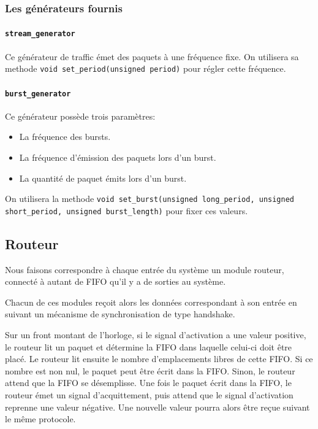 \subsubsection{Les générateurs fournis}

\paragraph{\texttt{stream\_generator} \\}

Ce générateur de traffic émet des paquets à une fréquence fixe. On utilisera sa
methode \texttt{void set\_period(unsigned period)} pour régler cette fréquence.

\paragraph{\texttt{burst\_generator} \\}

Ce générateur possède trois paramètres:
\begin{itemize}
  \item La fréquence des bursts.
  \item La fréquence d'émission des paquets lors d'un burst.
  \item La quantité de paquet émits lors d'un burst.
\end{itemize}
On utilisera la methode \texttt{void set\_burst(unsigned long\_period, unsigned
short\_period, unsigned burst\_length)} pour fixer ces valeurs.

\subsection{Routeur}

Nous faisons correspondre à chaque entrée du système un module routeur, connecté
à autant de FIFO qu'il y a de sorties au système.

Chacun de ces modules reçoit alors les données correspondant à son entrée en
suivant un mécanisme de synchronisation de type handshake.

Sur un front montant de l'horloge, si le signal d'activation a une valeur positive,
le routeur lit un paquet et détermine la FIFO dans laquelle celui-ci doit être placé.
Le routeur lit ensuite le nombre d'emplacements libres de cette FIFO.
Si ce nombre est non nul, le paquet peut être écrit dans la FIFO.
Sinon, le routeur attend que la FIFO se désemplisse.
Une fois le paquet écrit dans la FIFO, le routeur émet un signal d'acquittement,
puis attend que le signal d'activation reprenne une valeur négative.
Une nouvelle valeur pourra alors être reçue suivant le même protocole.

